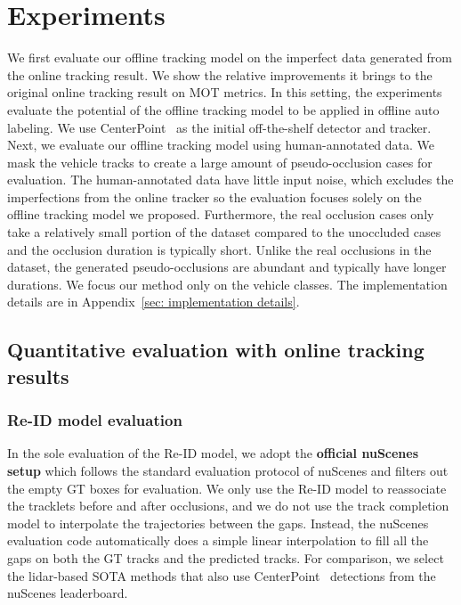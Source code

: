 \documentclass{article} \usepackage{iclr2023_conference,times}
\begin{document}
\section{Experiments}
\vspace{-1mm}
We first evaluate our offline tracking model on the imperfect data generated from the online tracking result. We show the relative improvements it brings to the original online tracking result on MOT metrics. In this setting, the experiments evaluate the potential of the offline tracking model to be applied in offline auto labeling. We use CenterPoint~\cite{Centerpoint} as the initial off-the-shelf detector and tracker. Next, we evaluate our offline tracking model using human-annotated data. We mask the vehicle tracks to create a large amount of pseudo-occlusion cases for evaluation. The human-annotated data have little input noise, which excludes the imperfections from the online tracker so the evaluation focuses solely on the offline tracking model we proposed. Furthermore, the real occlusion cases only take a relatively small portion of the dataset compared to the unoccluded cases and the occlusion duration is typically short. Unlike the real occlusions in the dataset, the generated pseudo-occlusions are abundant and typically have longer durations. We focus our method only on the vehicle classes. The implementation details are in Appendix~\ref{sec: implementation details}.
\vspace{-1mm}
\subsection{Quantitative evaluation with online tracking results}
\label{sec: online tracking eval}
\vspace{-1mm}
\subsubsection{Re-ID model evaluation}
\label{sec: Re-ID evaluation online}
\vspace{-1mm}
In the sole evaluation of the Re-ID model, we adopt the \textbf{official nuScenes setup} which follows the standard evaluation protocol of nuScenes and filters out the empty GT boxes for evaluation. We only use the Re-ID model to reassociate the tracklets before and after occlusions, and we do not use the track completion model to interpolate the trajectories between the gaps. Instead, the nuScenes evaluation code automatically does a simple linear interpolation to fill all the gaps on both the GT tracks and the predicted tracks. For comparison, we select the lidar-based SOTA methods that also use CenterPoint~\cite{Centerpoint} detections from the nuScenes leaderboard. 
\end{document}
